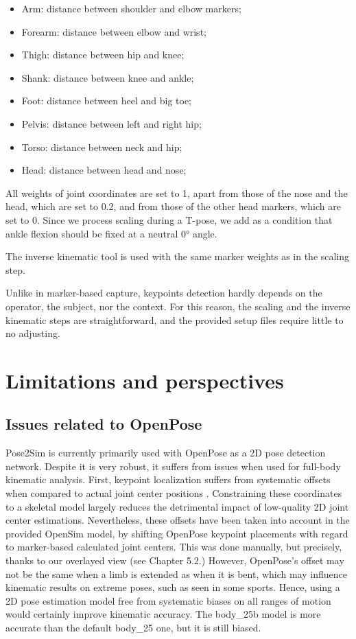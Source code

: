 \clearpage

\begin{itemize}[itemsep=0em, topsep=0em, leftmargin=*]
      \item{Arm: distance between shoulder and elbow markers;}
      \item{Forearm: distance between elbow and wrist;}
      \item{Thigh: distance between hip and knee;}
      \item{Shank: distance between knee and ankle;}
      \item{Foot: distance between heel and big toe;}
      \item{Pelvis: distance between left and right hip;}
      \item{Torso: distance between neck and hip;}
      \item{Head: distance between head and nose;}
\end{itemize}
All weights of joint coordinates are set to 1, apart from those of the nose and the head, which are set to 0.2, and from those of the other head markers, which are set to 0. Since we process scaling during a T-pose, we add as a condition that ankle flexion should be fixed at a neutral 0° angle.

The inverse kinematic tool is used with the same marker weights as in the scaling step.

Unlike in marker-based capture, keypoints detection hardly depends on the operator, the subject, nor the context. For this reason, the scaling and the inverse kinematic steps are straightforward, and the provided setup files require little to no adjusting.


\section{Limitations and perspectives}

\subsection{Issues related to OpenPose}

Pose2Sim is currently primarily used with OpenPose as a 2D pose detection network. Despite it is very robust, it suffers from issues when used for full-body kinematic analysis. First, keypoint localization suffers from systematic offsets when compared to actual joint center positions \cite{Needham2021b}. Constraining these coordinates to a skeletal model largely reduces the detrimental impact of low-quality 2D joint center estimations. Nevertheless, these offsets have been taken into account in the provided OpenSim model, by shifting OpenPose keypoint placements with regard to marker-based calculated joint centers. This was done manually, but precisely, thanks to our overlayed view (see  Chapter 5.2.) However, OpenPose’s offset may not be the same when a limb is extended as when it is bent, which may influence kinematic results on extreme poses, such as seen in some sports. Hence, using a 2D pose estimation model free from systematic biases on all ranges of motion would certainly improve kinematic accuracy. The body\_25b model is more accurate than the default body\_25 one, but it is still biased. 

